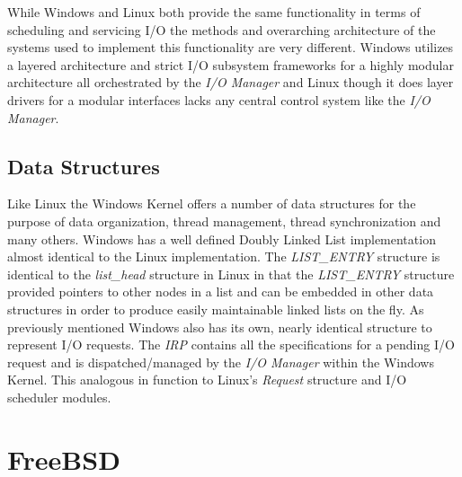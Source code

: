   \normalfont \indent While Windows and Linux both provide the same functionality in terms of scheduling and servicing I/O the methods and overarching architecture of the systems used to implement this functionality are very different. Windows utilizes a layered architecture and strict I/O subsystem frameworks for a highly modular architecture all orchestrated by the \textit{I/O Manager} and Linux though it does layer drivers for a modular interfaces lacks any central control system like the \textit{I/O Manager}. 

  \subsection{\bf Data Structures}
  \normalfont \indent Like Linux the Windows Kernel offers a number of data structures for the purpose of data organization, thread management, thread synchronization and many others. Windows has a well defined Doubly Linked List implementation almost identical to the Linux implementation. The \textit{LIST\_ENTRY} structure is identical to the \textit{list\_head} structure in Linux in that the \textit{LIST\_ENTRY} structure provided pointers to other nodes in a list and can be embedded in other data structures in order to produce easily maintainable linked lists on the fly. As previously mentioned Windows also has its own, nearly identical structure to represent I/O requests. The \textit{IRP} contains all the specifications for a pending I/O request and is dispatched/managed by the \textit{I/O Manager} within the Windows Kernel. This analogous in function to Linux’s \textit{Request} structure and I/O scheduler modules.


\section{\bf FreeBSD}
